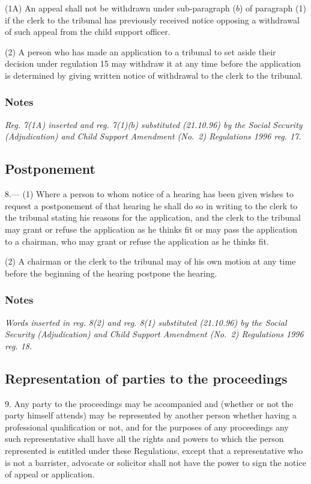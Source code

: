 \documentclass[a4paper]{article}
\newcommand\amendment[1]{\subsubsection*{Notes}{\itshape\frenchspacing\footnotesize #1 \par}}
\begin{document}
(1A) An appeal shall not be withdrawn under sub-paragraph ($b$) of paragraph (1) if the clerk to the tribunal has previously received notice opposing a withdrawal of such appeal from the child support officer.

(2) A person who has made an application to a tribunal to set aside their decision under regulation 15 may withdraw it at any time before the application is determined by giving written notice of withdrawal to the clerk to the tribunal.

\amendment{
Reg. 7(1A) inserted and reg. 7(1)($b$) substituted (21.10.96) by the Social Security (Adjudication) and Child Support Amendment (No.\ 2) Regulations 1996 reg. 17.
}

\subsection[8. Postponement]{Postponement}

8.—%
%
(1) Where a person to whom notice of a hearing has been given wishes to request a postponement of that hearing he shall do so in writing to the clerk to the tribunal stating his reasons for the application, and the clerk to the tribunal may grant or refuse the application as he thinks fit or may pass the application to a chairman, who may grant or refuse the application as he thinks fit.

(2) A chairman 
or the clerk to the tribunal  %
may of his own motion at any time before the beginning of the hearing postpone the hearing.

\amendment{
Words inserted in reg. 8(2) and reg. 8(1) substituted (21.10.96) by the Social Security (Adjudication) and Child Support Amendment (No.\ 2) Regulations 1996 reg. 18.
}

\subsection[9. Representation of parties to the proceedings]{Representation of parties to the proceedings}

9.  Any party to the proceedings may be accompanied and (whether or not the party himself attends) may be represented by another person whether having a professional qualification or not, and for the purposes of any proceedings any such representative shall have all the rights and powers to which the person represented is entitled under these Regulations, except that a representative who is not a barrister, advocate or solicitor shall not have the power to sign the notice of appeal or application.
\end{document}

